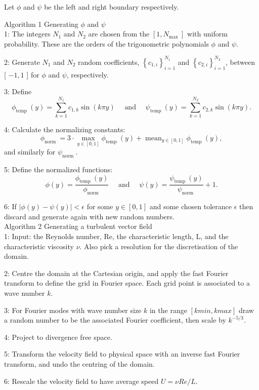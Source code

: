 \documentclass{article}
\begin{document}
Let $\phi$ and $\psi$ be the left and right boundary respectively. 

Algorithm 1 Generating $\phi$ and $\psi$ \\
1: The integers $N_1$ and $N_2$ are chosen from the $\left[1, N_{\text {max }}\right]$ with uniform probability. These are the orders of the trigonometric polynomials $\phi$ and $\psi$.

2: Generate $N_1$ and $N_2$ random coefficients, $\left\{c_{1, i}\right\}_{i=1}^{N_1}$ and $\left\{c_{2, i}\right\}_{i=1}^{N_2}$, between [ $-1,1$ ] for $\phi$ and $\psi$, respectively.

3: Define
$$
\phi_{\text {temp }}(y)=\sum_{k=1}^{N_1} c_{1, k} \sin (k \pi y) \quad \text { and } \quad \psi_{\text {temp }}(y)=\sum_{k=1}^{N_2} c_{2, k} \sin (k \pi y) .
$$

4: Calculate the normalizing constants:
$$
\phi_{\text {norm }}=3 \cdot \max _{y \in[0,1]} \phi_{\text {temp }}(y)+\operatorname{mean}_{y \in[0,1]} \phi_{\text {temp }}(y),
$$
and similarly for $\psi_{\text {norm }}$.

5: Define the normalized functions:
$$
\phi(y)=\frac{\phi_{\text {temp }}(y)}{\phi_{\text {norm }}} \quad \text { and } \quad \psi(y)=\frac{\psi_{\text {temp }}(y)}{\psi_{\text {norm }}}+1 .
$$

6: If $|\phi(y)-\psi(y)|<\epsilon$ for some $y \in[0,1]$ and some chosen tolerance $\epsilon$ then discard and generate again with new random numbers. \\

Algorithm 2 Generating a turbulent vector field \\

1: Input: the Reynolds number, Re, the characteristic length, L, and the characteristic
viscosity $\nu$. Also pick a resolution for the discretisation of the domain.

2: Centre the domain at the Cartesian origin, and apply the fast Fourier transform to
define the grid in Fourier space. Each grid point is associated to a wave number $k$.

3: For Fourier modes with wave number size $k$ in the range $[kmin, kmax]$ draw a random
number to be the associated Fourier coefficient, then scale by $k^{-5/3}$.

4: Project to divergence free space.

5: Transform the velocity field to physical space with an inverse fast Fourier transform,
and undo the centring of the domain.

6: Rescale the velocity field to have average speed $U = \nu Re/L$. \\
\end{document}
